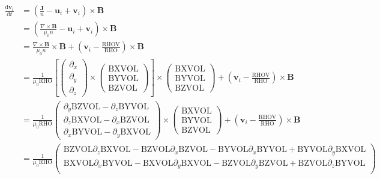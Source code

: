 \documentclass[a4paper,10pt]{article}
\newcommand{\vv}[1]{\mathbf{#1}}
\newcommand{\dif}{\mathrm{d}}
\newcommand{\pp}[1]{\left(#1\right)}
\begin{document}
\begin{align}
   \frac{\dif\vv{v}_i}{\dif t} &= \pp{\frac{\vv{J}}{n} - \vv{u}_i + \vv{v}_i}\times\vv{B} \\
   &= \pp{\frac{\nabla\times\vv{B}}{\mu_0 n} - \vv{u}_i + \vv{v}_i}\times\vv{B} \\
   &= \frac{\nabla\times\vv{B}}{\mu_0 n}\times\vv{B} + \pp{\vv{v}_i - \frac{\textrm{RHOV}}{\textrm{RHO}}}\times\vv{B} \\
   &= \frac{1}{\mu_0 \textrm{RHO}}
   \left[\begin{pmatrix}\partial_x \\ \partial_y \\ \partial_z\end{pmatrix}
   \times
   \begin{pmatrix}\textrm{BXVOL} \\ \textrm{BYVOL} \\ \textrm{BZVOL}\end{pmatrix}\right]
   \times
   \begin{pmatrix}\textrm{BXVOL} \\ \textrm{BYVOL} \\ \textrm{BZVOL}\end{pmatrix}
   + \pp{\vv{v}_i - \frac{\textrm{RHOV}}{\textrm{RHO}}}\times\vv{B} \\
   &= \frac{1}{\mu_0 \textrm{RHO}}
   \begin{pmatrix}
      \partial_y\textrm{BZVOL} - \partial_z\textrm{BYVOL} \\
      \partial_z\textrm{BXVOL} - \partial_x\textrm{BZVOL} \\
      \partial_x\textrm{BYVOL} - \partial_y\textrm{BXVOL}
   \end{pmatrix}
   \times
   \begin{pmatrix}
      \textrm{BXVOL} \\ \textrm{BYVOL} \\ \textrm{BZVOL}
   \end{pmatrix}
   + \pp{\vv{v}_i - \frac{\textrm{RHOV}}{\textrm{RHO}}}\times\vv{B} \\
   &= \frac{1}{\mu_0 \textrm{RHO}}
   \begin{pmatrix}
      \textrm{BZVOL}\partial_z\textrm{BXVOL} - \textrm{BZVOL}\partial_x\textrm{BZVOL} - \textrm{BYVOL}\partial_x\textrm{BYVOL} + \textrm{BYVOL}\partial_y\textrm{BXVOL} \\
      \textrm{BXVOL}\partial_x\textrm{BYVOL} - \textrm{BXVOL}\partial_y\textrm{BXVOL} - \textrm{BZVOL}\partial_y\textrm{BZVOL} + \textrm{BZVOL}\partial_z\textrm{BYVOL} \\

\end{pmatrix}
\end{align}
\end{document}
